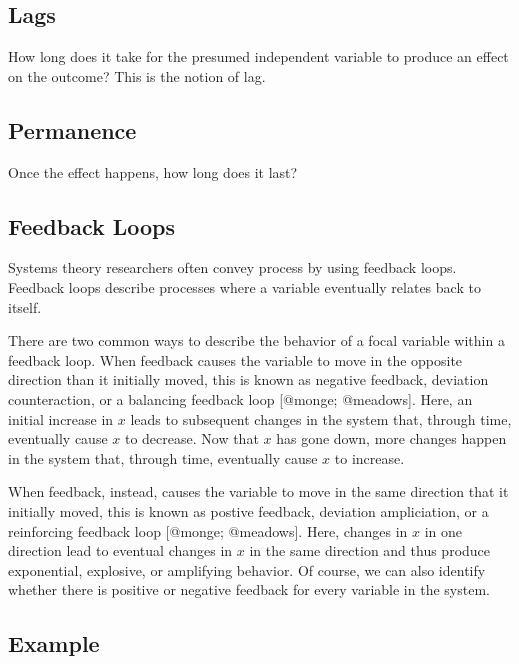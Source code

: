 \documentclass[]{article}
\begin{document}
\hypertarget{lags}{%
\subsection{Lags}\label{lags}}

How long does it take for the presumed independent variable to produce
an effect on the outcome? This is the notion of lag.

\hypertarget{permanence}{%
\subsection{Permanence}\label{permanence}}

Once the effect happens, how long does it last?

\hypertarget{feedback-loops}{%
\subsection{Feedback Loops}\label{feedback-loops}}

Systems theory researchers often convey process by using feedback loops.
Feedback loops describe processes where a variable eventually relates
back to itself.

There are two common ways to describe the behavior of a focal variable
within a feedback loop. When feedback causes the variable to move in the
opposite direction than it initially moved, this is known as negative
feedback, deviation counteraction, or a balancing feedback loop
{[}@monge; @meadows{]}. Here, an initial increase in \(x\) leads to
subsequent changes in the system that, through time, eventually cause
\(x\) to decrease. Now that \(x\) has gone down, more changes happen in
the system that, through time, eventually cause \(x\) to increase.

When feedback, instead, causes the variable to move in the same
direction that it initially moved, this is known as postive feedback,
deviation ampliciation, or a reinforcing feedback loop {[}@monge;
@meadows{]}. Here, changes in \(x\) in one direction lead to eventual
changes in \(x\) in the same direction and thus produce exponential,
explosive, or amplifying behavior. Of course, we can also identify
whether there is positive or negative feedback for every variable in the
system.

\hypertarget{example}{%
\subsection{Example}\label{example}}
\end{document}
